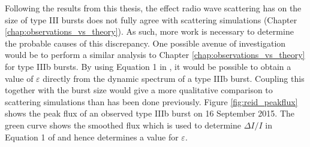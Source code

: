 %
%
Following the results from this thesis, the effect radio wave scattering has on the size of type III bursts does not fully agree with scattering simulations (Chapter \ref{chap:observations_vs_theory}). As such, more work is necessary to determine the probable causes of this discrepancy. One possible avenue of investigation would be to perform a similar analysis to Chapter \ref{chap:observations_vs_theory} for type IIIb bursts. By using Equation 1 in \cite{Reid2021}, it would be possible to obtain a value of $\varepsilon$ directly from the dynamic spectrum of a type IIIb burst. Coupling this together with the burst size would give a more qualitative comparison to scattering simulations than has been done previously. Figure \ref{fig:reid_peakflux} shows the peak flux of an observed type IIIb burst on 16 September 2015. The green curve shows the smoothed flux which is used to determine $\Delta I/I$ in Equation 1 of \cite{Reid2021} and hence determines a value for $\varepsilon$.

